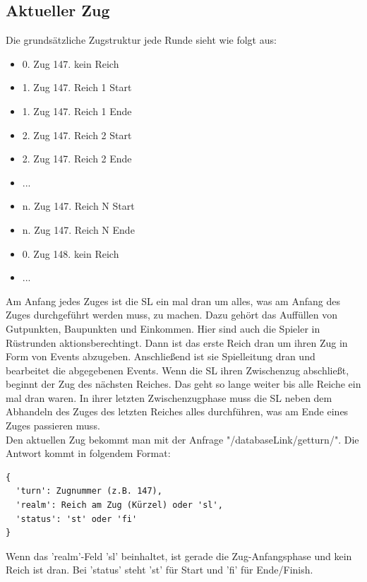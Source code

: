 \documentclass[11pt,a4paper,twocolumn]{article}
\begin{document}
\subsection{Aktueller Zug}\label{ss:turn_current}
Die grundsätzliche Zugstruktur jede Runde sieht wie folgt aus:
\begin{itemize}
\item 0. Zug 147. kein Reich
\item 1. Zug 147. Reich 1 Start
\item 1. Zug 147. Reich 1 Ende
\item 2. Zug 147. Reich 2 Start
\item 2. Zug 147. Reich 2 Ende
\item ...
\item n. Zug 147. Reich N Start
\item n. Zug 147. Reich N Ende
\item 0. Zug 148. kein Reich
\item ...
\end{itemize}
Am Anfang jedes Zuges ist die SL ein mal dran um alles, was am Anfang des Zuges durchgeführt werden muss, zu machen. Dazu gehört das Auffüllen von Gutpunkten, Baupunkten und Einkommen. Hier sind auch die Spieler in Rüstrunden aktionsberechtingt. Dann ist das erste Reich dran um ihren Zug in Form von Events abzugeben. Anschließend ist sie Spielleitung dran und bearbeitet die abgegebenen Events. Wenn die SL ihren Zwischenzug abschließt, beginnt der Zug des nächsten Reiches. Das geht so lange weiter bis alle Reiche ein mal dran waren. In ihrer letzten Zwischenzugphase muss die SL neben dem Abhandeln des Zuges des letzten Reiches alles durchführen, was am Ende eines Zuges passieren muss.\\
Den aktuellen Zug bekommt man mit der Anfrage "/databaseLink/getturn/". Die Antwort kommt in folgendem Format:
\begin{lstlisting}
{
  'turn': Zugnummer (z.B. 147),
  'realm': Reich am Zug (Kürzel) oder 'sl',
  'status': 'st' oder 'fi'
}
\end{lstlisting}
Wenn das 'realm'-Feld 'sl' beinhaltet, ist gerade die Zug-Anfangsphase und kein Reich ist dran. Bei 'status' steht 'st' für Start und 'fi' für Ende/Finish.
\end{document}
